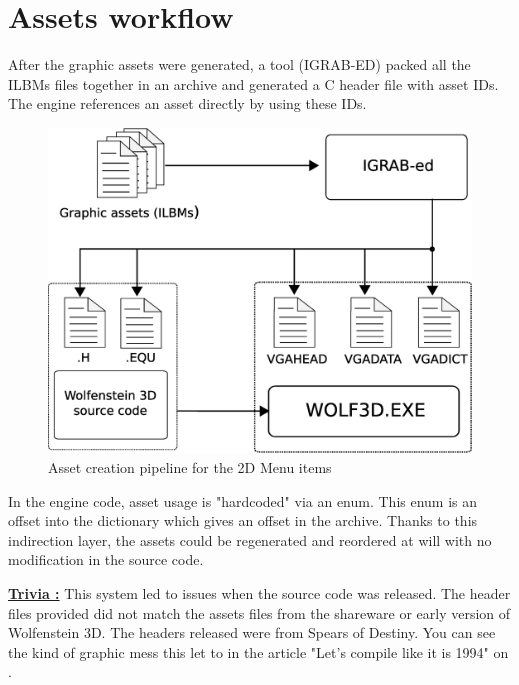 \documentclass[book.tex]{subfiles}
\begin{document}
\section{Assets workflow}
After the graphic assets were generated, a tool (IGRAB-ED) packed all the ILBMs files together in an archive and generated a C header file with asset IDs. The engine references an asset directly by using these IDs.\\
\begin{figure}[H]
\centering
 \includegraphics[width=\textwidth]{imgs/drawings/drawing_plain.eps}
 \caption{Asset creation pipeline for the 2D Menu items}
\end{figure}
\par
\begin{minipage}{\textwidth}
 \par
 \end{minipage}
 
 In the engine code, asset usage is "hardcoded" via an enum. This enum is an offset into the 
  dictionary which gives an offset in the  archive. Thanks to this indirection layer, the assets could be regenerated and reordered at will with no modification in the source code.\\
 \par
 \begin{minipage}{\textwidth}
 \par
 \end{minipage}
\par
\textbf{\underline{Trivia :}} This system led to issues when the source code was released. The  header files provided did not match the assets files from the shareware or early version of Wolfenstein 3D. The headers released were from Spears of Destiny. You can see the kind of graphic mess this let to in the article "Let's compile like it is 1994" on .\\
\end{document}

